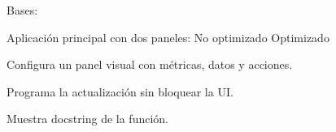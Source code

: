\documentclass[letterpaper,10pt,spanish]{sphinxmanual}
\begin{document}
\begin{fulllineitems}
\label{\detokenize{modulos:main.App}}
\pysigstartsignatures
\pysiglinewithargsret
{}
{}
{}
\pysigstopsignatures
\sphinxAtStartPar
Bases: 

\sphinxAtStartPar
Aplicación principal con dos paneles:
\sphinxhyphen{} No optimizado
\sphinxhyphen{} Optimizado

\begin{fulllineitems}
\label{\detokenize{modulos:main.App.setup_panel}}
\pysigstartsignatures
\pysiglinewithargsret
{}
{\sphinxparamcomma {}\sphinxparamcomma {}\sphinxparamcomma {}}
{}
\pysigstopsignatures
\sphinxAtStartPar
Configura un panel visual con métricas, datos y acciones.

\end{fulllineitems}


\begin{fulllineitems}
\label{\detokenize{modulos:main.App.update_data}}
\pysigstartsignatures
\pysiglinewithargsret
{}
{\sphinxparamcomma {}}
{}
\pysigstopsignatures
\sphinxAtStartPar
Programa la actualización sin bloquear la UI.

\end{fulllineitems}


\begin{fulllineitems}
\label{\detokenize{modulos:main.App.show_help}}
\pysigstartsignatures
\pysiglinewithargsret
{}
{}
{}
\pysigstopsignatures
\sphinxAtStartPar
Muestra docstring de la función.

\end{fulllineitems}


\begin{fulllineitems}
\label{\detokenize{modulos:main.App.on_close}}
\pysigstartsignatures
\pysiglinewithargsret
{}
{}
{}
\pysigstopsignatures
\end{fulllineitems}


\end{fulllineitems}
\end{document}
